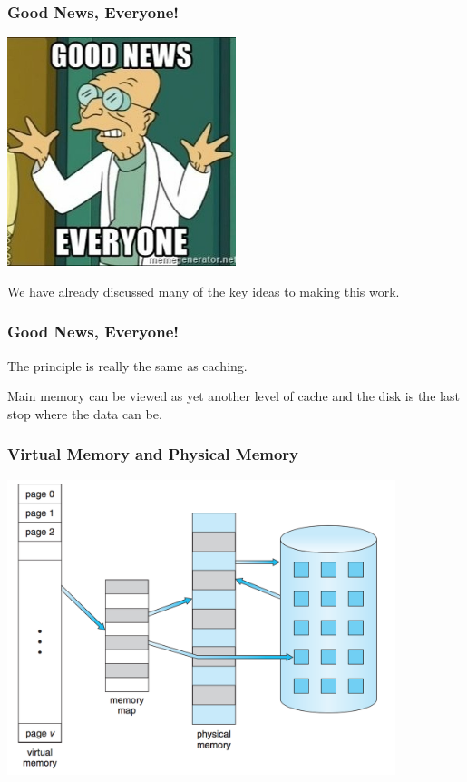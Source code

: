 \begin{frame}
\frametitle{Good News, Everyone!}

\begin{center}
	\includegraphics[width=0.5\textwidth]{images/goodnews.jpg}
\end{center}

We have already discussed many of the key ideas to making this work. 

\end{frame}

\begin{frame}
\frametitle{Good News, Everyone!}

The principle is really the same as caching. 

Main memory can be viewed as yet another level of cache and the disk is the last stop where the data can be. 


\end{frame}

\begin{frame}
\frametitle{Virtual Memory and Physical Memory}

\begin{center}
\includegraphics[width=0.85\textwidth]{images/vmem-physmem.png}
\end{center}

\end{frame}

